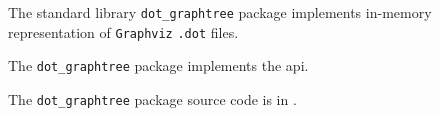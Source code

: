 
The standard library {\tt dot\_graphtree} package implements in-memory representation 
of {\tt Graphviz} {\tt .dot} files.

The {\tt dot\_graphtree} package implements the  api.

The {\tt dot\_graphtree} package source code is in .

